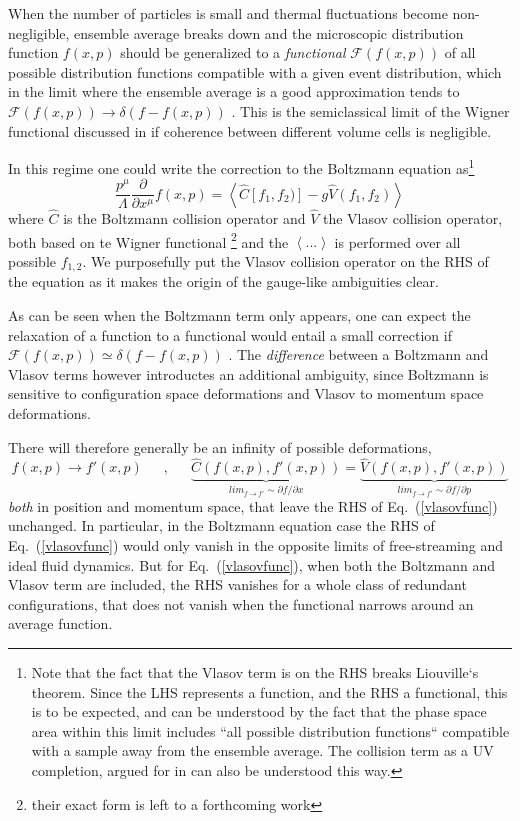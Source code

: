 \documentclass[12pt,onecolumn,showpacs,amssymb,aps,nofootinbib,floatfix]{revtex4-2}
\newcommand{\ave}[1]{\left\langle #1 \right\rangle}
\renewcommand{\eqref}[1]{Eq.~(\ref{#1})}
\newcommand{\eqcomma}{\phantom{AA},\phantom{AA}}
\begin{document}
        When the number of particles is small and thermal fluctuations become non-negligible, ensemble average breaks down  and the microscopic distribution function $f(x,p)$ should be generalized to a {\em functional } $\mathcal{F}(f(x,p))$ of all possible distribution functions compatible with a given event distribution, which in the limit where the ensemble average is a good approximation tends to $\mathcal{F}(f(x,p)) \rightarrow \delta(f-f(x,p))$ .   This is the semiclassical limit of the Wigner functional discussed in \cite{wignerf} if coherence between different volume cells is negligible.   

        In this regime one could write the correction to the Boltzmann equation as\footnote{Note that the fact that the Vlasov term is on the RHS breaks Liouville`s theorem.   Since the LHS represents a function, and the RHS a functional, this is to be expected, and can be understood by the fact that the phase space area within this limit includes ``all possible distribution functions`` compatible with a sample away from the ensemble average.  The collision term as a UV completion, argued for in \cite{villani} can also be understood this way.  }
\begin{equation}
\label{vlasovfunc}
\frac{p^\mu}{\Lambda} \frac{\partial}{\partial x^\mu} f(x,p)=\ave{
  \hat{C}[f_1,f_2)]
-g \hat{V}\left(f_1,f_2\right) }
\end{equation}
	where $\hat{C}$ is the Boltzmann collision operator and $\hat{V}$ the Vlasov collision operator, both based on te Wigner functional \cite{wignerf}\footnote{their exact form is left to a forthcoming work} and the $\ave{...}$ is performed over all possible $f_{1,2}$.   
We purposefully put the Vlasov collision operator on the RHS of the equation as it makes the origin of the gauge-like ambiguities clear.

As can be seen when the Boltzmann term only appears, one can expect the relaxation of a function to a functional would entail a small correction if $\mathcal{F}(f(x,p)) \simeq \delta(f-f(x,p))$ .   The {\em difference} between a Boltzmann and Vlasov terms however introductes an additional ambiguity, since Boltzmann is sensitive to configuration space deformations and Vlasov to momentum space deformations.

There will therefore generally be an infinity of possible deformations,
\begin{equation}
  \label{collinv}
f(x,p) \rightarrow f'(x,p) \eqcomma \underbrace{\hat{C}\left(f(x,p),f'(x,p)\right)}_{lim_{f \rightarrow f'} \sim \partial f/\partial x} = \underbrace{ \hat{V}\left(f(x,p),f'(x,p) \right)}_{lim_{f \rightarrow f'} \sim \partial f/\partial p}  \end{equation}
{\em both} in position and momentum space, that leave the RHS of \eqref{vlasovfunc} unchanged.   In particular, in the Boltzmann equation case the RHS of \eqref{vlasovfunc} would only vanish in the opposite limits of free-streaming and ideal fluid dynamics.   But for  \eqref{vlasovfunc}, when both the Boltzmann and Vlasov term are included, the RHS vanishes for a whole class of redundant configurations, that does not vanish when the functional narrows around an average function.
\end{document}
